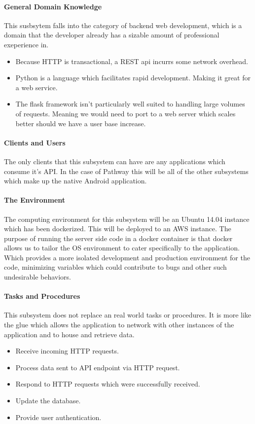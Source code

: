 ﻿\documentclass{article}
\begin{document}
\paragraph{General Domain Knowledge}
This susbsytem falls into the category of backend web development, which is a domain that the developer already has a sizable amount of professional exeperience in.
\begin{itemize}
    \item Because HTTP is transactional, a REST api incurrs some network overhead.
    \item Python is a language which facilitates rapid development. Making it great for a web service.
    \item The flask framework isn't particularly well suited to handling large volumes of requests. Meaning we would
    need to port to a web server which scales better should we have a user base increase.
\end{itemize}

\paragraph{Clients and Users}
The only clients that this subsystem can have are any applications which consume it's API. In the case of Pathway this will be all
of the other subsystems which make up the native Android application.

\paragraph{The Environment}
The computing environment for this subsystem will be an Ubuntu 14.04 instance which has been dockerized. This will be deployed to an AWS instance. The purpose of running the server side code in a docker container is that docker allows us to tailor the OS environment 
to cater specifically to the application. Which provides a more isolated development and production environment for the code, minimizing variables which could contribute to bugs and other such undesirable behaviors. 

\paragraph{Tasks and Procedures}
This subsystem does not replace an real world tasks or procedures. It is more like the glue which allows the application to 
network with other instances of the application and to house and retrieve data.
\begin{itemize}
    \item Receive incoming HTTP requests.
    \item Process data sent to API endpoint via HTTP request.
    \item Respond to HTTP requests which were successfully received.
    \item Update the database.
    \item Provide user authentication.
\end{itemize}
\end{document}
